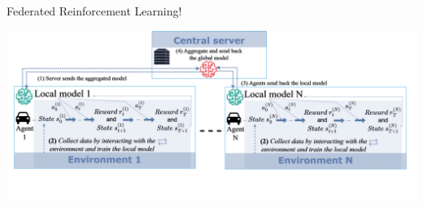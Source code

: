 \documentclass[aspectratio=169,12pt]{beamer}
\begin{document}
\begin{frame}{Federated Reinforcement Learning!}
  \begin{center}
    \includegraphics[width=\linewidth]{img/feddrldiag0.drawio.png}
  \end{center}
\end{frame}
\end{document}
